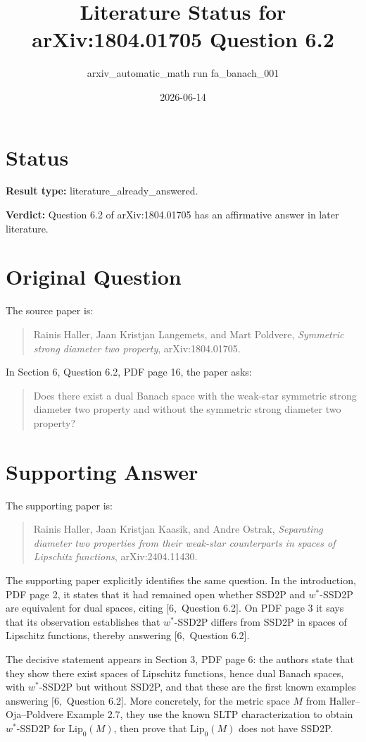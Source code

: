 \documentclass[11pt]{article}
\title{Literature Status for arXiv:1804.01705 Question 6.2}
\author{arxiv\_automatic\_math run fa\_banach\_001}
\date{2026-06-14}
\begin{document}
\maketitle

\section*{Status}

\textbf{Result type:} literature\_already\_answered.

\textbf{Verdict:} Question 6.2 of arXiv:1804.01705 has an affirmative answer in later literature.

\section*{Original Question}

The source paper is:
\begin{quote}
Rainis Haller, Jaan Kristjan Langemets, and Mart Poldvere,
\emph{Symmetric strong diameter two property}, arXiv:1804.01705.
\end{quote}

In Section 6, Question 6.2, PDF page 16, the paper asks:
\begin{quote}
Does there exist a dual Banach space with the weak-star symmetric strong
diameter two property and without the symmetric strong diameter two property?
\end{quote}

\section*{Supporting Answer}

The supporting paper is:
\begin{quote}
Rainis Haller, Jaan Kristjan Kaasik, and Andre Ostrak,
\emph{Separating diameter two properties from their weak-star counterparts in
spaces of Lipschitz functions}, arXiv:2404.11430.
\end{quote}

The supporting paper explicitly identifies the same question. In the
introduction, PDF page 2, it states that it had remained open whether SSD2P
and \(w^\ast\)-SSD2P are equivalent for dual spaces, citing
\([6,\) Question 6.2\(]\). On PDF page 3 it says that its observation
establishes that \(w^\ast\)-SSD2P differs from SSD2P in spaces of Lipschitz
functions, thereby answering \([6,\) Question 6.2\(]\).

The decisive statement appears in Section 3, PDF page 6: the authors state
that they show there exist spaces of Lipschitz functions, hence dual Banach
spaces, with \(w^\ast\)-SSD2P but without SSD2P, and that these are the first
known examples answering \([6,\) Question 6.2\(]\). More concretely, for the
metric space \(M\) from Haller--Oja--Poldvere Example 2.7, they use the known
SLTP characterization to obtain \(w^\ast\)-SSD2P for \(\mathrm{Lip}_0(M)\),
then prove that \(\mathrm{Lip}_0(M)\) does not have SSD2P.
\end{document}
